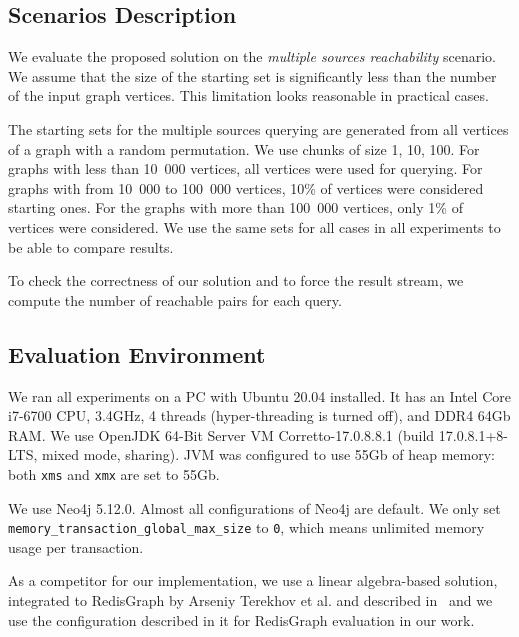 \documentclass[
11pt,%
tightenlines,%
twoside,%
onecolumn,%
nobibnotes,%
nofootinbib,%
superscriptaddress,%
noshowpacs,%
longbibliography,%
centertags]%
{revtex4-2}
\begin{document}
\subsection{Scenarios Description}

We evaluate the proposed solution on the \textit{multiple sources reachability} scenario. We assume that the size of the starting set is significantly less than the number of the input graph vertices. This limitation looks reasonable in practical cases.

The starting sets for the multiple sources querying are generated from all vertices of a graph with a random permutation. We use chunks of size 1, 10, 100. For graphs with less than 10~000 vertices, all vertices were used for querying. For graphs with from 10~000 to 100~000 vertices, 10\% of vertices were considered starting ones. For the graphs with more than 100~000 vertices, only 1\% of vertices were considered. We use the same sets for all cases in all experiments to be able to compare results.

To check the correctness of our solution and to force the result stream, we compute the number of reachable pairs for each query.

\subsection{Evaluation Environment}

We ran all experiments on a PC with Ubuntu 20.04 installed. It has an Intel Core i7-6700 CPU, 3.4GHz, 4 threads (hyper-threading is turned off), and DDR4 64Gb RAM. We use OpenJDK 64-Bit Server VM Corretto-17.0.8.8.1 (build 17.0.8.1+8-LTS, mixed mode, sharing). JVM was configured to use 55Gb of heap memory: both \texttt{xms} and \texttt{xmx} are set to 55Gb. 

We use Neo4j 5.12.0. Almost all configurations of Neo4j are default. We only set  \texttt{memory\_transaction\_global\_max\_size} to \texttt{0}, which means unlimited memory usage per transaction.

As a competitor for our implementation, we use a linear algebra-based solution, integrated to RedisGraph by Arseniy Terekhov et al. and described in~\cite{DBLP:conf/edbt/TerekhovPAZG21} and we use the configuration described in it for RedisGraph evaluation in our work.
\end{document}
